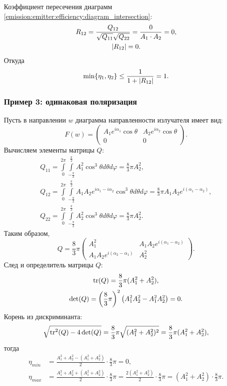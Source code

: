 Коэффициент пересечения диаграмм \eqref{emission:emitter:efficiency:diagram_intersection}:
\begin{gather*}
    R_{12}
    = \frac{Q_{12}}{\sqrt{Q_{11}} \sqrt{Q_{22}}}
    = \frac{0}{A_1 \cdot A_2}
    = 0, \\
    \left | R_{12} \right | = 0 .
\end{gather*}
Откуда
\[
    \min \{ \eta_1, \eta_2 \} \le \frac{1}{1 + \left | R_{12} \right |} = 1.
\]

\subsubsection{Пример 3: одинаковая поляризация}

Пусть в направлении $w$ диаграмма направленности излучателя имеет вид:
\[
    F(w)
    = \begin{pmatrix}
          A_1 e^{i \alpha_1} \cos \theta & A_2 e^{i \alpha_2} \cos \theta \\
          0                              & 0
    \end{pmatrix} .
\]
Вычисляем элементы матрицы $Q$:
\begin{gather*}
    Q_{11}
    = \int \limits_0^{2 \pi} \int \limits_{-\frac{\pi}{2}}^\frac{\pi}{2} A_1^2 \cos^3 \theta d\theta d\varphi
    = \frac{8}{3} \pi A_2^2 , \\
    Q_{12}
    = \int \limits_0^{2 \pi} \int \limits_{-\frac{\pi}{2}}^\frac{\pi}{2} A_1 A_2 e^{i \alpha_1 - i \alpha_2} \cos^3 \theta d\theta d\varphi
    = \frac{8}{3} \pi A_1 A_2 e^{i(\alpha_1 - \alpha_2)} , \\
    Q_{22}
    = \int \limits_0^{2 \pi} \int \limits_{-\frac{\pi}{2}}^\frac{\pi}{2} A_2^2 \cos^3 \theta d\theta d\varphi
    = \frac{8}{3} \pi A_2^2 .
\end{gather*}
Таким образом,
\[
    Q
    = \frac{8}{3} \pi
    \begin{pmatrix}
        A_1^2                              & A_1 A_2 e^{i(\alpha_1 - \alpha_2)} \\
        A_1 A_2 e^{i(\alpha_2 - \alpha_1)} & A_2^2
    \end{pmatrix} .
\]
След и определитель матрицы $Q$:
\begin{gather*}
    \operatorname{tr}(Q) = \frac{8}{3} \pi ( A_1^2 + A_2^2 ) , \\
    \det(Q)
    = \left( \frac{8}{3} \pi \right)^2 \left( A_1^2 A_2^2 - A_1^2 A_2^2 \right)
    = 0 .
\end{gather*}
Корень из дискриминанта:
\[
    \sqrt{\operatorname{tr}^2(Q) - 4 \det(Q)}
    = \frac{8}{3} \pi \sqrt{( A_1^2 + A_2^2 )^2}
    = \frac{8}{3} \pi ( A_1^2 + A_2^2 ),
\]
тогда
\begin{align*}
    \eta_{min} &
    = \frac{A_1^2 + A_2^2 - ( A_1^2 + A_2^2 )}{2} \cdot \frac{8}{3} \pi
    = 0 , \\
    \eta_{max} &
    = \frac{A_1^2 + A_2^2 + ( A_1^2 + A_2^2 )}{2} \cdot \frac{8}{3} \pi
    = \frac{2 (A_1^2 + A_2^2)}{2} \cdot \frac{8}{3} \pi
    = (A_1^2 + A_2^2) \cdot \frac{8}{3} \pi .
\end{align*}

